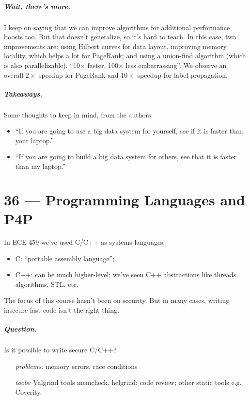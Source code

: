 \documentclass[a4paper]{report}
\begin{document}
\paragraph{Wait, there's more.} I keep on saying that we can improve algorithms for additional performance boosts too.
But that doesn't generalize, so it's hard to teach. In this case, two improvements are: using Hilbert curves
for data layout, improving memory locality, which helps a lot for PageRank; and using a union-find algorithm 
(which is also parallelizable). ``10$\times$ faster, 100$\times$ less embarrassing''.  We observe an overall
$2\times$ speedup for PageRank and $10\times$ speedup for label propagation.

\paragraph{Takeaways.} Some thoughts to keep in mind, from the authors:
\begin{itemize}
\item    ``If you are going to use a big data system for yourself, see if it is faster than your laptop.''
\item    ``If you are going to build a big data system for others, see that it is faster than my laptop.''
\end{itemize}











\chapter*{36 --- Programming Languages and P4P}


In ECE 459 we've used C/C++ as systems languages:
\vspace*{-1.5em}
\begin{itemize}[noitemsep]
\item C: ``portable assembly language'';
\item C++: can be much higher-level; we've seen C++ abstractions like threads, algorithms, STL, etc.
\end{itemize}
The focus of this course hasn't been on security. But in many cases, writing insecure fast code
isn't the right thing.

\paragraph{Question.} Is it possible to write secure C/C++?
\vspace*{-1.5em}
\begin{itemize}[noitemsep]
\item[\emph{problems:}] memory errors, race conditions
\item[\emph{tools:}] Valgrind tools memcheck, helgrind; code review; other static tools e.g. Coverity.
\end{itemize}
\end{document}
